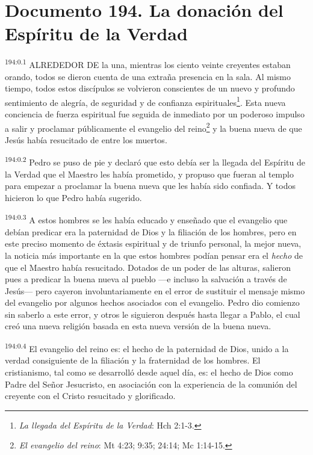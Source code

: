 \chapter{Documento 194. La donación del Espíritu de la Verdad}
\par 
\textsuperscript{194:0.1} ALREDEDOR DE la una, mientras los ciento veinte creyentes estaban orando, todos se dieron cuenta de una extraña presencia en la sala. Al mismo tiempo, todos estos discípulos se volvieron conscientes de un nuevo y profundo sentimiento de alegría, de seguridad y de confianza espirituales\footnote{\textit{La llegada del Espíritu de la Verdad}: Hch 2:1-3.}. Esta nueva conciencia de fuerza espiritual fue seguida de inmediato por un poderoso impulso a salir y proclamar públicamente el evangelio del reino\footnote{\textit{El evangelio del reino}: Mt 4:23; 9:35; 24:14; Mc 1:14-15.} y la buena nueva de que Jesús había resucitado de entre los muertos.

\par 
\textsuperscript{194:0.2} Pedro se puso de pie y declaró que esto debía ser la llegada del Espíritu de la Verdad que el Maestro les había prometido, y propuso que fueran al templo para empezar a proclamar la buena nueva que les había sido confiada. Y todos hicieron lo que Pedro había sugerido.

\par 
\textsuperscript{194:0.3} A estos hombres se les había educado y enseñado que el evangelio que debían predicar era la paternidad de Dios y la filiación de los hombres, pero en este preciso momento de éxtasis espiritual y de triunfo personal, la mejor nueva, la noticia más importante en la que estos hombres podían pensar era el \textit{hecho} de que el Maestro había resucitado. Dotados de un poder de las alturas, salieron pues a predicar la buena nueva al pueblo ---e incluso la salvación a través de Jesús--- pero cayeron involuntariamente en el error de sustituir el mensaje mismo del evangelio por algunos hechos asociados con el evangelio. Pedro dio comienzo sin saberlo a este error, y otros le siguieron después hasta llegar a Pablo, el cual creó una nueva religión basada en esta nueva versión de la buena nueva.

\par 
\textsuperscript{194:0.4} El evangelio del reino es: el hecho de la paternidad de Dios, unido a la verdad consiguiente de la filiación y la fraternidad de los hombres. El cristianismo, tal como se desarrolló desde aquel día, es: el hecho de Dios como Padre del Señor Jesucristo, en asociación con la experiencia de la comunión del creyente con el Cristo resucitado y glorificado.

